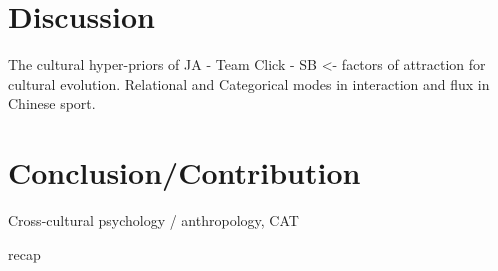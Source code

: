 \section{Discussion}



The cultural hyper-priors of JA - Team Click - SB <- factors of attraction for cultural evolution.
Relational and Categorical modes in interaction and flux in Chinese sport.






\section{Conclusion/Contribution}
Cross-cultural psychology / anthropology, CAT

recap
